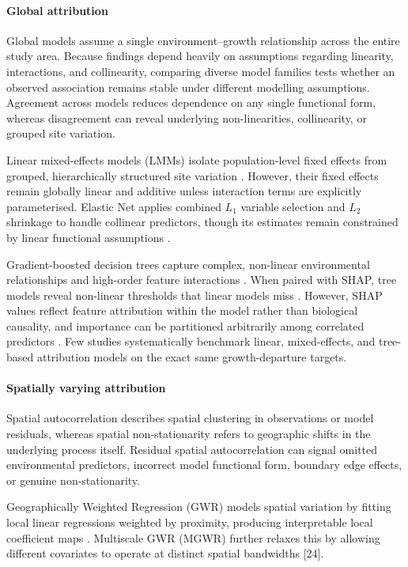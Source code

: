 \documentclass[logo,msc,ai]{infthesis}           %
\begin{document}
\paragraph*{Global attribution}
Global models assume a single environment--growth relationship across the entire study area. Because findings depend heavily on assumptions regarding linearity, interactions, and collinearity, comparing diverse model families tests whether an observed association remains stable under different modelling assumptions. Agreement across models reduces dependence on any single functional form, whereas disagreement can reveal underlying non-linearities, collinearity, or grouped site variation.

Linear mixed-effects models (LMMs) isolate population-level fixed effects from grouped, hierarchically structured site variation \cite{harrison2018Brief_LMM, socha2016Assessment_C2_CR}. However, their fixed effects remain globally linear and additive unless interaction terms are explicitly parameterised. Elastic Net applies combined $L_1$ variable selection and $L_2$ shrinkage to handle collinear predictors, though its estimates remain constrained by linear functional assumptions \cite{zou2005Regularization_C4_NN}.

Gradient-boosted decision trees capture complex, non-linear environmental relationships and high-order feature interactions \cite{puliti2023Tree_C2_CR, chen2016XGBoost_C4_NN}. When paired with SHAP, tree models reveal non-linear thresholds that linear models miss \cite{lundberg2017Unified_C7_XAI}. However, SHAP values reflect feature attribution within the model rather than biological causality, and importance can be partitioned arbitrarily among correlated predictors \cite{aas2021Explaining_C7_XAI}. Few studies systematically benchmark linear, mixed-effects, and tree-based attribution models on the exact same growth-departure targets.

\paragraph*{Spatially varying attribution}
Spatial autocorrelation describes spatial clustering in observations or model residuals, whereas spatial non-stationarity refers to geographic shifts in the underlying process itself. Residual spatial autocorrelation can signal omitted environmental predictors, incorrect model functional form, boundary edge effects, or genuine non-stationarity. 

Geographically Weighted Regression (GWR) models spatial variation by fitting local linear regressions weighted by proximity, producing interpretable local coefficient maps \cite{brunsdon1996Geographically_C6_GWR, wheeler2005Multicollinearity_C6_GWR}. Multiscale GWR (MGWR) further relaxes this by allowing different covariates to operate at distinct spatial bandwidths [24].
\end{document}
